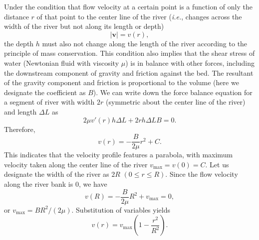 \documentclass{article}
\renewcommand\vec{\mathbf}
\begin{document}
Under the condition that flow velocity at a certain point is a function of only the distance $r$ of that point to the center line of the river (\textit{i.e.}, changes across the width of the river but not along its length or depth)
\begin{equation*}
    |\vec{v}| = v(r),
\end{equation*}
the depth $h$ must also not change along the length of the river according to the principle of mass conservation. This condition also implies that the shear stress of water (Newtonian fluid with viscosity $\mu$) is in balance with other forces, including the downstream component of gravity and friction against the bed. The resultant of the gravity component and friction is proportional to the volume (here we designate the coefficient as $B$). We can write down the force balance equation for a segment of river with width $2r$ (symmetric about the center line of the river) and length $\Delta L$ as
\begin{equation*}
    2\mu v'(r) h \Delta L + 2r h \Delta L B = 0.
\end{equation*}
Therefore,
\begin{equation*}
    v(r) = -\frac{B}{2\mu}r^2 + C.
\end{equation*}
This indicates that the velocity profile features a parabola, with maximum velocity taken along the center line of the river $v_{\max} = v(0) = C$. Let us designate the width of the river as $2R$ $(0 \leq r \leq R)$. Since the flow velocity along the river bank is 0, we have
\begin{equation*}
    v(R) = -\frac{B}{2\mu}R^2 + v_{\max} = 0,
\end{equation*}
or $v_{\max} =  BR^2/(2\mu)$. Substitution of variables yields
\begin{equation}
    v(r) = v_{\max}(1 - \frac{r^2}{R^2}).
    \label{v-r}
\end{equation}
\end{document}
